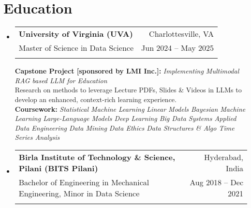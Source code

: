 \documentclass[letter paper,11pt]{article}
\makeatletter
\newcommand{\resumeSubheading}[5]{%
  \item
    \begin{tabular*}
    {1\textwidth}
    {l@{\extracolsep{\fill}}r}
      \textbf{#1} & \small#2 \\
      {\small#3} & {\small #4} \\
      {\small#5}
    \end{tabular*}%
  \vspace{-0.95cm}
}
\newcommand{\resumeSubHeadingListStart}{\begin{itemize}[leftmargin=0.0in, label={}]}
\newcommand{\resumeSubHeadingListEnd}{\end{itemize}}
\makeatother
\begin{document}
\section{\large{Education}}
    \resumeSubHeadingListStart
    
    \resumeSubheading
         {University of Virginia (UVA)}{Charlottesville, VA}
        {Master of Science in Data Science}{Jun 2024 -- May 2025}{}
        
        \vspace{9pt}
        
        \footnotesize{\textbf{Capstone Project [sponsored by LMI Inc.]:} \textsl{Implementing Multimodal RAG based LLM for Education} \\
        {Research on methods to leverage Lecture PDFs, Slides \& Videos in LLMs to develop an enhanced, context-rich learning experience.
        }\\
        \vspace{2px}
        \textbf{Coursework:}
        \textsl{Statistical Machine Learning \textbullet{} 
        Linear Models \textbullet{} 
        Bayesian Machine Learning \textbullet{} 
        Large-Language Models \textbullet{}
        Deep Learning \textbullet{}
        Big Data Systems \textbullet{} 
        Applied Data Engineering \textbullet{}
        Data Mining \textbullet{} 
        Data Ethics \textbullet{} 
        Data Structures \& Algo \textbullet{}
        Time Series Analysis
        }}

    
    \vspace{3pt}    
    \resumeSubheading
        {\small{Birla Institute of Technology \& Science, Pilani (BITS Pilani)}}{Hyderabad, India}{Bachelor of Engineering in Mechanical Engineering, Minor in Data Science}{Aug 2018 -- Dec 2021}{}
   

 \resumeSubHeadingListEnd 
%




 


\vspace{-12pt}
\end{document}
